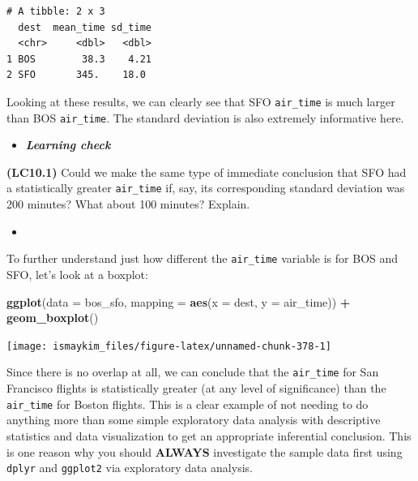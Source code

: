 \documentclass[12pt,]{krantz}
\makeatletter
\newenvironment{Shaded}{\begin{snugshade}}{\end{snugshade}}
\newcommand{\KeywordTok}[1]{\textcolor[rgb]{0.27,0.27,0.27}{\textbf{#1}}}
\newcommand{\DataTypeTok}[1]{\textcolor[rgb]{0.27,0.27,0.27}{#1}}
\newcommand{\StringTok}[1]{\textcolor[rgb]{0.5,0.5,0.5}{#1}}
\newcommand{\OperatorTok}[1]{\textcolor[rgb]{0.43,0.43,0.43}{\textbf{#1}}}
\newcommand{\NormalTok}[1]{#1}
\newenvironment{kframe}{%
\medskip{}
\setlength{\fboxsep}{.8em}
 \def\at@end@of@kframe{}%
 \ifinner\ifhmode%
  \def\at@end@of@kframe{\end{minipage}}%
  \begin{minipage}{\columnwidth}%
 \fi\fi%
 \def\FrameCommand##1{\hskip\@totalleftmargin \hskip-\fboxsep
 \colorbox{shadecolor}{##1}\hskip-\fboxsep
     \hskip-\linewidth \hskip-\@totalleftmargin \hskip\columnwidth}%
 \MakeFramed {\advance\hsize-\width
   \@totalleftmargin\z@ \linewidth\hsize
   \@setminipage}}%
 {\par\unskip\endMakeFramed%
 \at@end@of@kframe}
\renewenvironment{Shaded}{\begin{kframe}}{\end{kframe}}
\newenvironment{rmdblock}[1]
  {\begin{shaded*}
  \begin{itemize}
  \renewcommand{\labelitemi}{
    \raisebox{-.7\height}[0pt][0pt]{
    }
  }
  \item
  }
  {
  \end{itemize}
  \end{shaded*}
  }
\newenvironment{learncheck}
  {\begin{rmdblock}{warning}}
  {\end{rmdblock}}
\makeatother
\begin{document}
\begin{verbatim}
# A tibble: 2 x 3
  dest  mean_time sd_time
  <chr>     <dbl>   <dbl>
1 BOS        38.3    4.21
2 SFO       345.    18.0 
\end{verbatim}

Looking at these results, we can clearly see that SFO \texttt{air\_time}
is much larger than BOS \texttt{air\_time}. The standard deviation is
also extremely informative here.

\begin{learncheck}
\textbf{\emph{Learning check}}
\end{learncheck}

\textbf{(LC10.1)} Could we make the same type of immediate conclusion
that SFO had a statistically greater \texttt{air\_time} if, say, its
corresponding standard deviation was 200 minutes? What about 100
minutes? Explain.

\begin{learncheck}

\end{learncheck}

To further understand just how different the \texttt{air\_time} variable
is for BOS and SFO, let's look at a boxplot:

\begin{Shaded}
\begin{Highlighting}[]
\KeywordTok{ggplot}\NormalTok{(}\DataTypeTok{data =}\NormalTok{ bos_sfo, }\DataTypeTok{mapping =} \KeywordTok{aes}\NormalTok{(}\DataTypeTok{x =}\NormalTok{ dest, }\DataTypeTok{y =}\NormalTok{ air_time)) }\OperatorTok{+}
\StringTok{  }\KeywordTok{geom_boxplot}\NormalTok{()}
\end{Highlighting}
\end{Shaded}

\begin{center}\texttt{[image: ismaykim\_files/figure-latex/unnamed-chunk-378-1]} \end{center}

Since there is no overlap at all, we can conclude that the
\texttt{air\_time} for San Francisco flights is statistically greater
(at any level of significance) than the \texttt{air\_time} for Boston
flights. This is a clear example of not needing to do anything more than
some simple exploratory data analysis with descriptive statistics and
data visualization to get an appropriate inferential conclusion. This is
one reason why you should \textbf{ALWAYS} investigate the sample data
first using \texttt{dplyr} and \texttt{ggplot2} via exploratory data
analysis.
\end{document}
